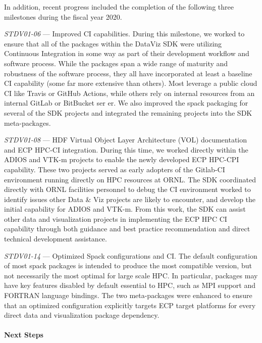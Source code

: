In addition, recent progress included the completion of the following three milestones during the fiscal year 2020.

\textit{STDV01-06} --- Improved CI capabilities. During this milestone, we worked to ensure that all of the packages within the DataViz SDK were utilizing Continuous Integration in some way as part of their development workflow and software process. While the packages span a wide range of maturity and robustness of the software process, they all have incorporated at least a baseline CI capability (some far more extensive than others). Most leverage a public cloud CI like Travis or GitHub Actions, while others rely on internal resources from an internal GitLab or BitBucket ser er. We also improved the spack packaging for several of the SDK projects and integrated the remaining projects into the SDK meta-packages.

\textit{STDV01-08} --- HDF Virtual Object Layer Architecture (VOL) documentation and ECP HPC-CI integration. During this time, we worked directly within the ADIOS and VTK-m projects to enable the newly developed ECP HPC-CPI capability. These two projects served as early adopters of the Gitlab-CI environment running directly on HPC resources at ORNL. The SDK coordinated directly with ORNL facilities personnel to debug the CI environment worked to identify issues other Data & Viz projects are likely to encounter, and develop the initial capability for ADIOS and VTK-m. From this work, the SDK can assist other data and visualization projects in implementing the ECP HPC CI capability through both guidance and best practice recommendation and direct technical development assistance.

\textit{STDV01-14} --- Optimized Spack configurations and CI. The default configuration of most spack packages is intended to produce the most compatible version, but not necessarily the most optimal for large scale HPC. In particular, packages may have key features disabled by default essential to HPC, such as MPI support and FORTRAN language bindings. The two meta-packages were enhanced to ensure that an optimized configuration explicitly targets ECP target platforms for every direct data and visualization package dependency.

\paragraph{\textbf{Next Steps}}
\paragraph{}

